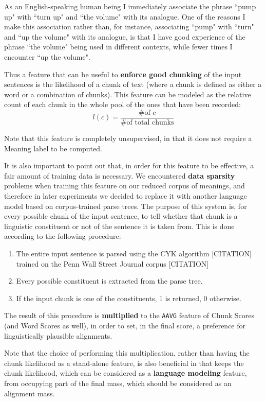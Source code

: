 As an English-speaking human being I immediately associate the phrase ``pump up" with ``turn up" and ``the volume" with its analogue. One of the reasons I make this association rather than, for instance, associating ``pump" with ``turn" and ``up the volume" with its analogue, is that I have good experience of the phrase ``the volume" being used in different contexts, while fewer times I encounter ``up the volume".

Thus a feature that can be useful to \textbf{enforce good chunking} of the input sentences is the likelihood of a chunk of text (where a chunk is defined as either a word or a combination of chunks). This feature can be modeled as the relative count of each chunk in the whole pool of the ones that have been recorded:
$$
l(c)=\frac{\text{\# of }c}{\text{\# of total chunks}}
$$

Note that this feature is completely unsupervised, in that it does not require a Meaning label to be computed.

It is also important to point out that, in order for this feature to be effective, a fair amount of training data is necessary. We encountered \textbf{data sparsity} problems when training this feature on our reduced corpus of meanings, and therefore in later experiments we decided to replace it with another language model based on corpus-trained parse trees. The purpose of this system is, for every possible chunk of the input sentence, to tell whether that chunk is a linguistic constituent or not of the sentence it is taken from. This is done according to the following procedure:
\begin{enumerate}
	\item The entire input sentence is parsed using the CYK algorithm [CITATION] trained on the Penn Wall Street Journal corpus [CITATION]
	\item Every possible constituent is extracted from the parse tree.
	\item If the input chunk is one of the constituents, 1 is returned, 0 otherwise.
\end{enumerate}
The result of this procedure is \textbf{multiplied} to the \texttt{AAVG} feature of Chunk Scores (and Word Scores as well), in order to set, in the final score, a preference for linguistically plausible alignments.

Note that the choice of performing this multiplication, rather than having the chunk likelihood as a stand-alone feature, is also beneficial in that keeps the chunk likelihood, which can be considered as a \textbf{language modeling} feature, from occupying part of the final mass, which should be considered as an alignment mass.

